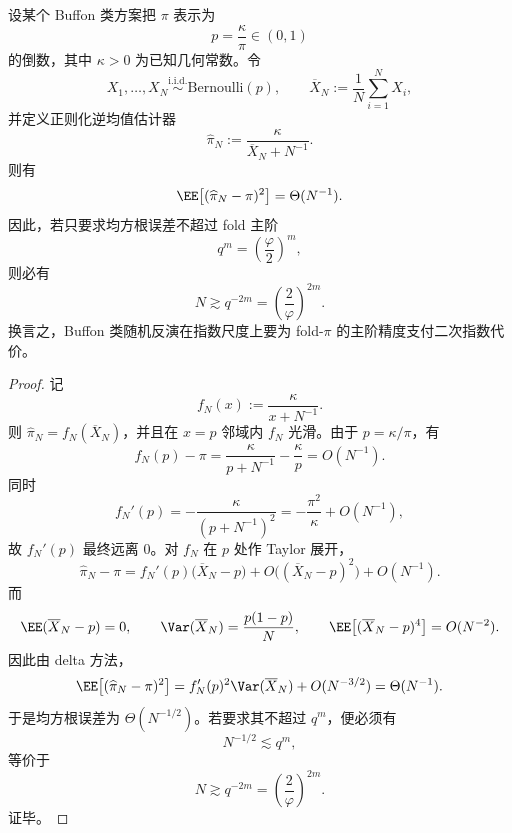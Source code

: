 \begin{theorem}\label{thm:conclusion-foldgauge-pi-buffon-quadratic-exponential-cost}
设某个 Buffon 类方案把 \(\pi\) 表示为
\[
p=\frac{\kappa}{\pi}\in(0,1)
\]
的倒数，其中 \(\kappa>0\) 为已知几何常数。令
\[
X_1,\dots,X_N\stackrel{\mathrm{i.i.d.}}{\sim}\mathrm{Bernoulli}(p),
\qquad
\overline X_N:=\frac1N\sum_{i=1}^{N}X_i,
\]
并定义正则化逆均值估计器
\[
\widehat\pi_N:=\frac{\kappa}{\overline X_N+N^{-1}}.
\]
则有
\[
\EE\bigl[(\widehat\pi_N-\pi)^2\bigr]=\Theta(N^{-1}).
\]
因此，若只要求均方根误差不超过 fold 主阶
\[
q^m=\left(\frac{\varphi}{2}\right)^m,
\]
则必有
\[
N\gtrsim q^{-2m}
=
\left(\frac{2}{\varphi}\right)^{2m}.
\]
换言之，Buffon 类随机反演在指数尺度上要为 fold-\(\pi\) 的主阶精度支付二次指数代价。
\end{theorem}
\begin{proof}
记
\[
f_N(x):=\frac{\kappa}{x+N^{-1}}.
\]
则 \(\widehat\pi_N=f_N(\overline X_N)\)，并且在 \(x=p\) 邻域内 \(f_N\) 光滑。由于 \(p=\kappa/\pi\)，有
\[
f_N(p)-\pi
=
\frac{\kappa}{p+N^{-1}}-\frac{\kappa}{p}
=
O(N^{-1}).
\]
同时
\[
f_N'(p)=-\frac{\kappa}{(p+N^{-1})^2}
=
-\frac{\pi^2}{\kappa}+O(N^{-1}),
\]
故 \(f_N'(p)\) 最终远离 \(0\)。对 \(f_N\) 在 \(p\) 处作 Taylor 展开，
\[
\widehat\pi_N-\pi
=
f_N'(p)\bigl(\overline X_N-p\bigr)+O\!\bigl((\overline X_N-p)^2\bigr)+O(N^{-1}).
\]
而
\[
\EE(\overline X_N-p)=0,
\qquad
\Var(\overline X_N)=\frac{p(1-p)}{N},
\qquad
\EE\bigl[(\overline X_N-p)^4\bigr]=O(N^{-2}).
\]
因此由 delta 方法，
\[
\EE\bigl[(\widehat\pi_N-\pi)^2\bigr]
=
f_N'(p)^2\Var(\overline X_N)+O(N^{-3/2})
=
\Theta(N^{-1}).
\]
于是均方根误差为 \(\Theta(N^{-1/2})\)。若要求其不超过 \(q^m\)，便必须有
\[
N^{-1/2}\lesssim q^m,
\]
等价于
\[
N\gtrsim q^{-2m}
=
\left(\frac{2}{\varphi}\right)^{2m}.
\]
证毕。
\end{proof}

